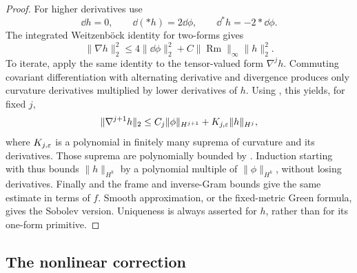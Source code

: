 \begin{proof}
For higher derivatives use
\begin{equation}
  \dd h=0,\qquad \dd(*h)=2\dd\phi,\qquad
  \dd^*h=-2*\dd\phi.
  \label{eq:auxiliary-divergence-identities}
\end{equation}
The integrated Weitzenb\"ock identity for two-forms gives
\[
  \|\nabla h\|_2^2
  \le 4\|\dd\phi\|_2^2
      +C\|\operatorname{Rm}\|_\infty\|h\|_2^2.
\]
To iterate, apply the same identity to the tensor-valued form
$\nabla^j h$.  Commuting covariant differentiation with alternating
derivative and divergence produces only curvature derivatives
multiplied by lower derivatives of $h$.  Using
, this yields, for fixed $j$,
\[
  \|\nabla^{j+1}h\|_2
  \le C_j\|\phi\|_{H^{j+1}}
      +K_{j,\varepsilon}\|h\|_{H^j},
\]
where $K_{j,\varepsilon}$ is a polynomial in finitely many suprema of
curvature and its derivatives.  Those suprema are polynomially
bounded by .  Induction starting with
 thus bounds $\|h\|_{H^k}$ by a
polynomial multiple of $\|\phi\|_{H^k}$, without losing derivatives.
Finally  and the frame and
inverse-Gram bounds give the same estimate in terms of $f$.
Smooth approximation, or the fixed-metric Green formula, gives the
Sobolev version.  Uniqueness is always asserted for $h$, rather than
for its one-form primitive.
\end{proof}

\subsection{The nonlinear correction}

